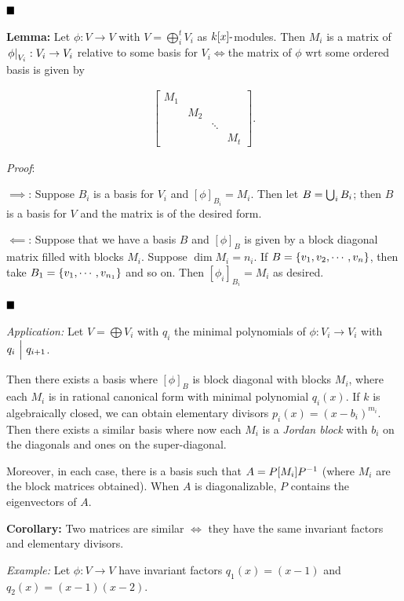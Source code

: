 \(\qed\)

\textbf{Lemma:} Let \(\phi: V\to V\) with \(V = \bigoplus_i^t V_i\) as
\(k[x]{\hbox{-}}\)modules. Then \(M_i\) is a matrix of
\({\left.{\phi}\right|_{V_i}}: V_i \to V_i\) relative to some basis for
\(V_i \iff\)the matrix of \(\phi\) wrt some ordered basis is given by

\begin{align*}
\left[
\begin{array}{cccc}
M_1 &  & & \\
& M_2 & & \\
& & \ddots & \\
& & & M_t
\end{array}\right]
.\end{align*}

\emph{Proof}:

\(\implies\): Suppose \(B_i\) is a basis for \(V_i\) and
\([\phi]_{B_i} = M_i\). Then let \(B = \bigcup_i B_i\); then \(B\) is a
basis for \(V\) and the matrix is of the desired form.

\(\impliedby\): Suppose that we have a basis \(B\) and \([\phi]_B\) is
given by a block diagonal matrix filled with blocks \(M_i\). Suppose
\(\dim M_i = n_i\). If \(B = \left\{{v_1, v_2, \cdots, v_n}\right\}\), then take
\(B_1 = \left\{{v_1, \cdots, v_{n_1}}\right\}\) and so on. Then
\([\phi_i]_{B_i} = M_i\) as desired.

\(\qed\)

\emph{Application:} Let \(V = \bigoplus V_i\) with \(q_i\) the minimal
polynomials of \(\phi: V_i \to V_i\) with \(q_i {~\Bigm| ~} q_{i+1}\).

Then there exists a basis where \([\phi]_B\) is block diagonal with
blocks \(M_i\), where each \(M_i\) is in rational canonical form with
minimal polynomial \(q_i(x)\). If \(k\) is algebraically closed, we can
obtain elementary divisors \(p_i(x) = (x - b_i)^{m_i}\). Then there
exists a similar basis where now each \(M_i\) is a \emph{Jordan block}
with \(b_i\) on the diagonals and ones on the super-diagonal.

Moreover, in each case, there is a basis such that \(A = P [M_i] P^{-1}\)
(where \(M_i\) are the block matrices obtained). When \(A\) is
diagonalizable, \(P\) contains the eigenvectors of \(A\).

\textbf{Corollary:} Two matrices are similar \(\iff\) they have the same
invariant factors and elementary divisors.

\emph{Example:} Let \(\phi: V\to V\) have invariant factors
\(q_1(x) = (x-1)\) and \(q_2(x) = (x-1)(x-2)\).

